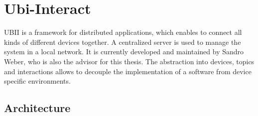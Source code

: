 \section{Ubi-Interact}\label{section:ubi-interact}

\ac{UBII} is a framework for distributed applications, which enables to connect all kinds of different devices together. A centralized server is used to manage the system in a local network. It is currently developed and maintained by Sandro Weber, who is also the advisor for this thesis. The abstraction into devices, topics and interactions allows to decouple the implementation of a software from device specific environments.


\subsection{Architecture}\label{subsection:architecture}


